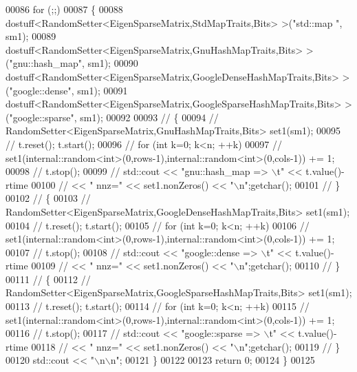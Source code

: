 \begin{DoxyCode}
00086   \textcolor{keywordflow}{for} (;;)
00087   \{
00088     dostuff<RandomSetter<EigenSparseMatrix,StdMapTraits,Bits> >(\textcolor{stringliteral}{"std::map     "}, sm1);
00089     dostuff<RandomSetter<EigenSparseMatrix,GnuHashMapTraits,Bits> >(\textcolor{stringliteral}{"gnu::hash\_map"}, sm1);
00090     dostuff<RandomSetter<EigenSparseMatrix,GoogleDenseHashMapTraits,Bits> >(\textcolor{stringliteral}{"google::dense"}, sm1);
00091     dostuff<RandomSetter<EigenSparseMatrix,GoogleSparseHashMapTraits,Bits> >(\textcolor{stringliteral}{"google::sparse"}, sm1);
00092 
00093 \textcolor{comment}{//     \{}
00094 \textcolor{comment}{//       RandomSetter<EigenSparseMatrix,GnuHashMapTraits,Bits> set1(sm1);}
00095 \textcolor{comment}{//       t.reset(); t.start();}
00096 \textcolor{comment}{//       for (int k=0; k<n; ++k)}
00097 \textcolor{comment}{//         set1(internal::random<int>(0,rows-1),internal::random<int>(0,cols-1)) += 1;}
00098 \textcolor{comment}{//       t.stop();}
00099 \textcolor{comment}{//       std::cout << "gnu::hash\_map => \(\backslash\)t" << t.value()-rtime}
00100 \textcolor{comment}{//                 << " nnz=" << set1.nonZeros() << "\(\backslash\)n";getchar();}
00101 \textcolor{comment}{//     \}}
00102 \textcolor{comment}{//     \{}
00103 \textcolor{comment}{//       RandomSetter<EigenSparseMatrix,GoogleDenseHashMapTraits,Bits> set1(sm1);}
00104 \textcolor{comment}{//       t.reset(); t.start();}
00105 \textcolor{comment}{//       for (int k=0; k<n; ++k)}
00106 \textcolor{comment}{//         set1(internal::random<int>(0,rows-1),internal::random<int>(0,cols-1)) += 1;}
00107 \textcolor{comment}{//       t.stop();}
00108 \textcolor{comment}{//       std::cout << "google::dense => \(\backslash\)t" << t.value()-rtime}
00109 \textcolor{comment}{//                 << " nnz=" << set1.nonZeros() << "\(\backslash\)n";getchar();}
00110 \textcolor{comment}{//     \}}
00111 \textcolor{comment}{//     \{}
00112 \textcolor{comment}{//       RandomSetter<EigenSparseMatrix,GoogleSparseHashMapTraits,Bits> set1(sm1);}
00113 \textcolor{comment}{//       t.reset(); t.start();}
00114 \textcolor{comment}{//       for (int k=0; k<n; ++k)}
00115 \textcolor{comment}{//         set1(internal::random<int>(0,rows-1),internal::random<int>(0,cols-1)) += 1;}
00116 \textcolor{comment}{//       t.stop();}
00117 \textcolor{comment}{//       std::cout << "google::sparse => \(\backslash\)t" << t.value()-rtime}
00118 \textcolor{comment}{//                 << " nnz=" << set1.nonZeros() << "\(\backslash\)n";getchar();}
00119 \textcolor{comment}{//     \}}
00120     std::cout << \textcolor{stringliteral}{"\(\backslash\)n\(\backslash\)n"};
00121   \}
00122 
00123   \textcolor{keywordflow}{return} 0;
00124 \}
00125 
\end{DoxyCode}
